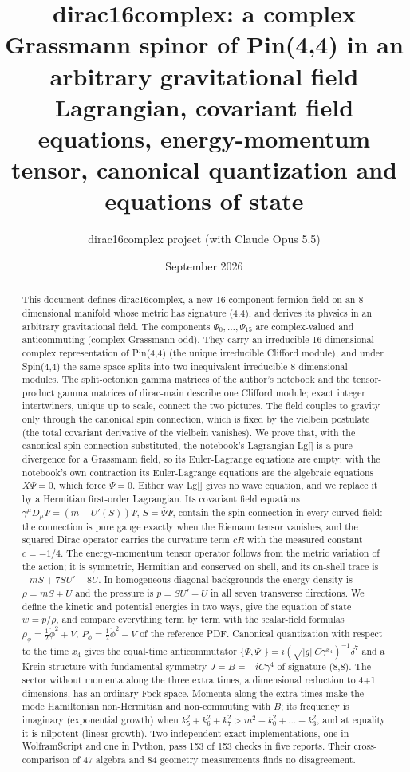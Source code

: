 \documentclass[11pt]{article}
\title{dirac16complex: a complex Grassmann spinor of Pin(4,4) in an arbitrary gravitational field\\[0.5em]\large Lagrangian, covariant field equations, energy-momentum tensor, canonical quantization and equations of state}
\author{dirac16complex project (with Claude Opus 5.5)}
\date{September 2026}
\begin{document}
\maketitle
\tableofcontents
\newpage
\begin{abstract}
This document defines dirac16complex, a new 16-component fermion field on an 8-dimensional manifold whose metric has signature (4,4), and derives its physics in an arbitrary gravitational field. The components $\Psi_0,\dots,\Psi_{15}$ are complex-valued and anticommuting (complex Grassmann-odd). They carry an irreducible 16-dimensional complex representation of Pin(4,4) (the unique irreducible Clifford module), and under Spin(4,4) the same space splits into two inequivalent irreducible 8-dimensional modules. The split-octonion gamma matrices of the author's notebook and the tensor-product gamma matrices of dirac-main describe one Clifford module; exact integer intertwiners, unique up to scale, connect the two pictures. The field couples to gravity only through the canonical spin connection, which is fixed by the vielbein postulate (the total covariant derivative of the vielbein vanishes). We prove that, with the canonical spin connection substituted, the notebook's Lagrangian Lg[] is a pure divergence for a Grassmann field, so its Euler-Lagrange equations are empty; with the notebook's own contraction its Euler-Lagrange equations are the algebraic equations $X\Psi=0$, which force $\Psi=0$. Either way Lg[] gives no wave equation, and we replace it by a Hermitian first-order Lagrangian. Its covariant field equations $\gamma^\mu D_\mu\Psi=(m+U'(S))\Psi$, $S=\bar\Psi\Psi$, contain the spin connection in every curved field: the connection is pure gauge exactly when the Riemann tensor vanishes, and the squared Dirac operator carries the curvature term $cR$ with the measured constant $c=-1/4$. The energy-momentum tensor operator follows from the metric variation of the action; it is symmetric, Hermitian and conserved on shell, and its on-shell trace is $-mS+7SU'-8U$. In homogeneous diagonal backgrounds the energy density is $\rho=mS+U$ and the pressure is $p=SU'-U$ in all seven transverse directions. We define the kinetic and potential energies in two ways, give the equation of state $w=p/\rho$, and compare everything term by term with the scalar-field formulas $\rho_\phi=\tfrac12\dot\phi^2+V$, $P_\phi=\tfrac12\dot\phi^2-V$ of the reference PDF. Canonical quantization with respect to the time $x_4$ gives the equal-time anticommutator $\{\Psi,\Psi^\dagger\}=i(\sqrt{|g|}\,C\gamma^{x_4})^{-1}\delta^7$ and a Krein structure with fundamental symmetry $J=B=-iC\gamma^4$ of signature (8,8). The sector without momenta along the three extra times, a dimensional reduction to 4+1 dimensions, has an ordinary Fock space. Momenta along the extra times make the mode Hamiltonian non-Hermitian and non-commuting with $B$; its frequency is imaginary (exponential growth) when $k_5^2+k_6^2+k_7^2>m^2+k_0^2+\dots+k_3^2$, and at equality it is nilpotent (linear growth). Two independent exact implementations, one in WolframScript and one in Python, pass 153 of 153 checks in five reports. Their cross-comparison of 47 algebra and 84 geometry measurements finds no disagreement.

\end{abstract}
\end{document}
